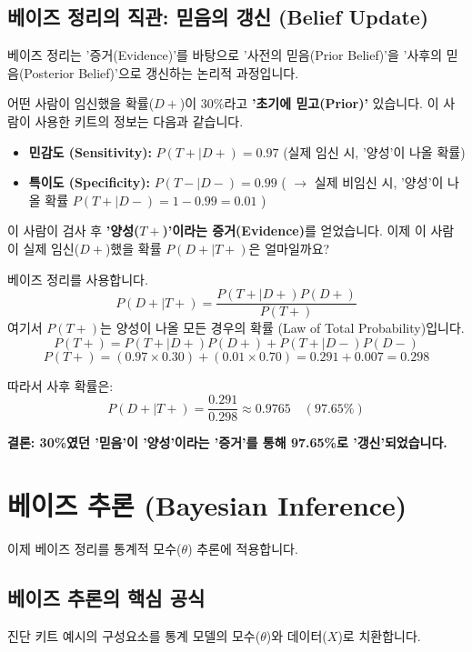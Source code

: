 \documentclass[11pt,a4paper]{book}
\theoremstyle{definition}
\begin{document}
\subsection{베이즈 정리의 직관: 믿음의 갱신 (Belief Update)}

베이즈 정리는 '증거(Evidence)'를 바탕으로 '사전의 믿음(Prior Belief)'을 '사후의 믿음(Posterior Belief)'으로 갱신하는 논리적 과정입니다.

\begin{examplebox}[title=직관적 예시: 임신 진단 키트]
    어떤 사람이 임신했을 확률($D+$)이 30\%라고 \textbf{'초기에 믿고(Prior)'} 있습니다.
    이 사람이 사용한 키트의 정보는 다음과 같습니다.
    \begin{itemize}
        \item \textbf{민감도 (Sensitivity):} $P(T+|D+) = 0.97$ (실제 임신 시, '양성'이 나올 확률)
        \item \textbf{특이도 (Specificity):} $P(T-|D-) = 0.99$
            ( $\rightarrow$ 실제 비임신 시, '양성'이 나올 확률 $P(T+|D-) = 1 - 0.99 = 0.01$ )
    \end{itemize}
    이 사람이 검사 후 \textbf{'양성($T+$)'이라는 증거(Evidence)}를 얻었습니다.
    이제 이 사람이 실제 임신($D+$)했을 확률 $P(D+|T+)$은 얼마일까요?

    베이즈 정리를 사용합니다.
    $$ P(D+|T+) = \frac{P(T+|D+) P(D+)}{P(T+)} $$
    여기서 $P(T+)$는 양성이 나올 모든 경우의 확률 (Law of Total Probability)입니다.
    $$ P(T+) = P(T+|D+)P(D+) + P(T+|D-)P(D-) $$
    $$ P(T+) = (0.97 \times 0.30) + (0.01 \times 0.70) = 0.291 + 0.007 = 0.298 $$
    
    따라서 사후 확률은:
    $$ P(D+|T+) = \frac{0.291}{0.298} \approx 0.9765 \quad (97.65\%) $$

    \textbf{결론: 30\%였던 '믿음'이 '양성'이라는 '증거'를 통해 97.65\%로 '갱신'되었습니다.}
\end{examplebox}


\section{베이즈 추론 (Bayesian Inference)}

이제 베이즈 정리를 통계적 모수($\theta$) 추론에 적용합니다.

\subsection{베이즈 추론의 핵심 공식}

진단 키트 예시의 구성요소를 통계 모델의 모수($\theta$)와 데이터($X$)로 치환합니다.
\end{document}
